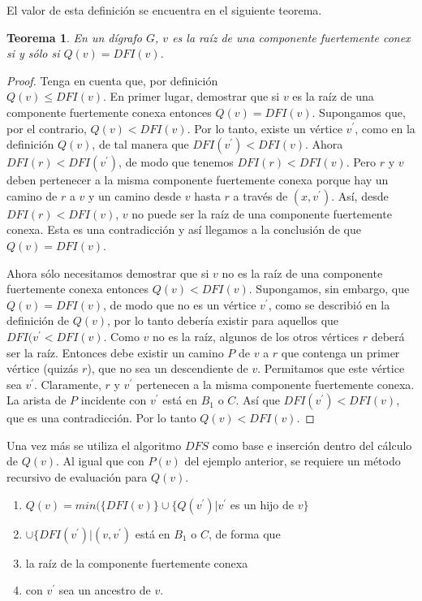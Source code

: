 \documentclass[10pt,a5paper]{book}
\newtheorem{teorema}{Teorema}[chapter]
\begin{document}
El valor de esta definición se encuentra en el siguiente teorema.
\begin{teorema}
En un dígrafo $G$, $v$ es la raíz de una componente fuertemente conex si y sólo si $Q(v) = DFI(v)$.
\end{teorema}
\begin{proof}
Tenga en cuenta que, por definición \\$Q(v) \le DFI(v)$.
En primer lugar, demostrar que si $v$ es la raíz de una componente fuertemente conexa entonces $Q(v) = DFI(v)$. Supongamos que, por el contrario, $Q(v) < DFI(v)$. Por lo tanto, existe un vértice $v^{'}$, como en la definición $Q(v)$, de tal manera que $DFI(v^{'}) < DFI(v)$. Ahora $DFI(r) < DFI(v^{'})$, de modo que tenemos $DFI(r) < DFI(v)$. Pero $r$ y $v$ deben pertenecer a la misma componente fuertemente conexa porque hay un camino de $r$ a $v$ y un camino desde $v$ hasta $r$ a través de $(x,v^{'})$. Así, desde $DFI(r) < DFI(v)$, $v$ no puede ser la raíz de una componente fuertemente conexa. Esta es una contradicción y así llegamos a la conclusión de que $Q(v) = DFI(v)$.

Ahora sólo necesitamos demostrar que si $v$ no es la raíz de una componente fuertemente conexa entonces $Q(v) < DFI(v)$. Supongamos, sin embargo, que $Q(v) = DFI(v)$, de modo que no es un vértice $v^{'}$, como se describió en la definición de $Q(v)$, por lo tanto debería existir para aquellos que $DFI(v^{'} < DFI(v)$. Como $v$ no es la raíz, algunos de los otros vértices $r$ deberá ser la raíz. Entonces debe existir un camino $P$ de $v$ a $r$ que contenga un primer vértice (quizás $r$), que no sea un descendiente de $v$. Permitamos que este vértice sea $v^{'}$. Claramente, $r$ y $v^{'}$ pertenecen a la misma componente fuertemente conexa. La arista de $P$ incidente con $v^{'}$ está en $B_1$ o $C$. Así que $DFI(v^{'}) < DFI(v)$, que es una contradicción. Por lo tanto $Q(v) < DFI(v)$.
\end{proof}
Una vez más se utiliza el algoritmo $DFS$ como base e inserción dentro del cálculo de $Q(v)$. Al igual que con $P(v)$ del ejemplo anterior, se requiere un método recursivo de evaluación para $Q(v)$.
\begin{enumerate}
\item[] \hspace*{0.05in}$Q(v) = min(\{DFI(v)\} \cup \{Q(v^{'})|v^{'}$ es un hijo de $v\}$
\item[] \hspace*{0.1in} $\cup \{DFI(v^{'})|(v,v^{'})$ está en $B_1$ o $C$, de forma que
\item[] \hspace*{0.1in} la raíz de la componente fuertemente conexa 
\item[] \hspace*{0.1in} con $v^{'}$ sea un ancestro de $v$.
\end{enumerate}
\end{document}

